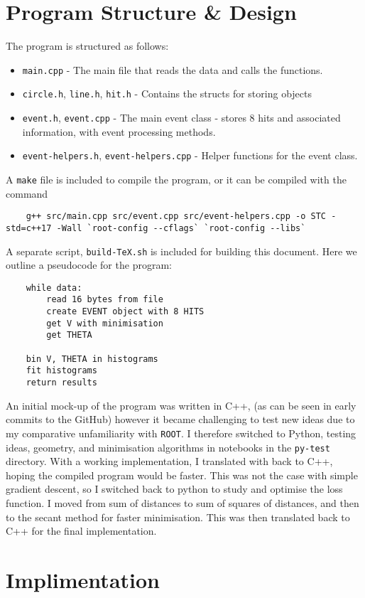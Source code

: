 \documentclass[11pt]{article}
\begin{document}
\section{Program Structure \& Design}
\label{sec:program}
The program is structured as follows:
\begin{itemize}
    \item \texttt{main.cpp} - The main file that reads the data and calls the functions.
    \item \texttt{circle.h}, \texttt{line.h}, \texttt{hit.h} - Contains the structs for storing objects
    \item \texttt{event.h}, \texttt{event.cpp} - The main event class - stores 8 hits and associated information, with event processing methods.
    \item \texttt{event-helpers.h}, \texttt{event-helpers.cpp} - Helper functions for the event class.
\end{itemize}
A \texttt{make} file is included to compile the program, or it can be compiled with the command
\begin{verbatim}
    g++ src/main.cpp src/event.cpp src/event-helpers.cpp -o STC -std=c++17 -Wall `root-config --cflags` `root-config --libs`
\end{verbatim}
A separate script, \texttt{build-TeX.sh} is included for building this document. Here we outline a pseudocode for the program:
\begin{verbatim}
    while data:
        read 16 bytes from file
        create EVENT object with 8 HITS
        get V with minimisation
        get THETA
    
    bin V, THETA in histograms
    fit histograms
    return results
\end{verbatim}
An initial mock-up of the program was written in C++, (as can be seen in early commits to the GitHub) however it became challenging to test new ideas due to my comparative unfamiliarity with \texttt{ROOT}. I therefore switched to Python, testing ideas, geometry, and minimisation algorithms in notebooks in the \texttt{py-test} directory. With a working implementation, I translated with back to C++, hoping the compiled program would be faster. This was not the case with simple gradient descent, so I switched back to python to study and optimise the loss function. I moved from sum of distances to sum of squares of distances, and then to the secant method for faster minimisation. This was then translated back to C++ for the final implementation.

\section{Implimentation}
\label{sec:implimentation}
\end{document}
